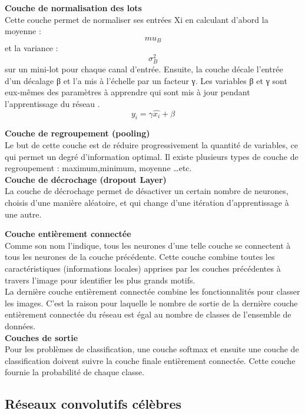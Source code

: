 {\textbf{Couche de normalisation des lots}}\\

Cette couche permet de normaliser ses entrées Xi en calculant d'abord la moyenne :\[mu _B\]  et la variance : 
 \[\sigma _B^{2}\]
 sur un mini-lot pour chaque canal d'entrée. 
Ensuite, la couche décale l'entrée d'un décalage β et l’a mis à l'échelle par un facteur γ. Les variables β et γ sont eux-mêmes des paramètres à apprendre qui sont mis à jour pendant l'apprentissage du réseau \cite{59}.\\
                \[y_i=\gamma \hat{x_i}+\beta\]


{\textbf{Couche de regroupement (pooling)}}\\

Le but de cette couche est de réduire progressivement la quantité de variables, ce qui permet un degré d’information optimal. Il existe plusieurs types de couche de regroupement : maximum,minimum, moyenne …etc.\\

{\textbf{Couche de décrochage (dropout Layer)}}\\

La couche de décrochage permet de désactiver un certain nombre de neurones, choisis d’une manière aléatoire, et qui change d’une itération d’apprentissage à une autre. 

{\textbf{Couche entièrement connectée}}\\

Comme son nom l'indique, tous les neurones d'une telle couche se connectent à tous les neurones de la couche précédente. Cette couche combine toutes les caractéristiques (informations
locales) apprises par les couches précédentes à travers l'image pour identifier les plus grands motifs.\\
La dernière couche entièrement connectée combine les fonctionnalités pour classer les images. C'est la raison pour laquelle le nombre de sortie de la dernière couche entièrement connectée du réseau est égal au nombre de classes de l'ensemble de données.\\

{\textbf{Couches de sortie}}\\

Pour les problèmes de classification, une couche softmax et ensuite une couche de classification doivent suivre la couche finale entièrement connectée. Cette couche fournie la probabilité de chaque classe.

\subsection{Réseaux convolutifs célèbres}

